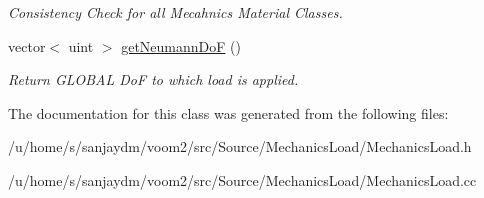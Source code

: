 \begin{DoxyCompactItemize}
\begin{DoxyCompactList}\small\item\em Consistency Check for all Mecahnics Material Classes. \item\end{DoxyCompactList}\item 
\hypertarget{classvoom_1_1_mechanics_load_ac6171ce7c8c616e8caef1906a102e656}{
vector$<$ uint $>$ \hyperlink{classvoom_1_1_mechanics_load_ac6171ce7c8c616e8caef1906a102e656}{getNeumannDoF} ()}
\label{classvoom_1_1_mechanics_load_ac6171ce7c8c616e8caef1906a102e656}

\begin{DoxyCompactList}\small\item\em Return GLOBAL DoF to which load is applied. \item\end{DoxyCompactList}\end{DoxyCompactItemize}


The documentation for this class was generated from the following files:\begin{DoxyCompactItemize}
\item 
/u/home/s/sanjaydm/voom2/src/Source/MechanicsLoad/MechanicsLoad.h\item 
/u/home/s/sanjaydm/voom2/src/Source/MechanicsLoad/MechanicsLoad.cc\end{DoxyCompactItemize}
